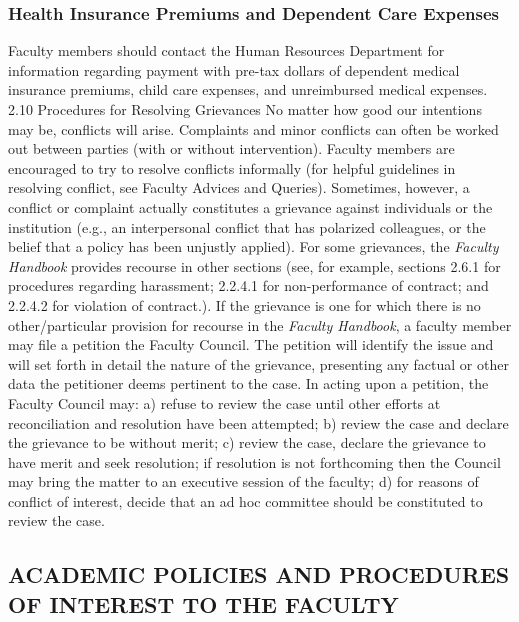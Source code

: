 \documentclass[letterpaper, 11pt]{article}
\begin{document}
		\subsubsection{Health Insurance Premiums and Dependent Care Expenses}
			Faculty members should contact the Human Resources Department for information regarding payment with pre-tax dollars of dependent medical insurance premiums, child care expenses, and unreimbursed medical expenses.
			2.10 Procedures for Resolving Grievances
			No matter how good our intentions may be, conflicts will arise.  Complaints and minor conflicts can often be worked out between parties (with or without intervention).  Faculty members are encouraged to try to resolve conflicts informally (for helpful guidelines in resolving conflict, see Faculty Advices and Queries).
			Sometimes, however, a conflict or complaint actually constitutes a grievance against individuals or the institution (e.g., an interpersonal conflict that has polarized colleagues, or the belief that a policy has been unjustly applied).  For some grievances, the \emph{Faculty Handbook} provides recourse in other sections (see, for example, sections 2.6.1 for procedures regarding harassment; 2.2.4.1 for non-performance of contract; and 2.2.4.2 for violation of contract.).
			If the grievance is one for which there is no other/particular provision for recourse in the \emph{Faculty Handbook}, a faculty member may file a petition the Faculty Council.  The petition will identify the issue and will set forth in detail the nature of the grievance, presenting any factual or other data the petitioner deems pertinent to the case.  In acting upon a petition, the Faculty Council may:
			a) refuse to review the case until other efforts at reconciliation and resolution have been attempted;
			b) review the case and declare the grievance to be without merit;
			c) review the case, declare the grievance to have merit and seek resolution; if resolution is not forthcoming then the Council may bring the matter to an executive session of the faculty;
			d) for reasons of conflict of interest, decide that an ad hoc committee should be constituted to review the case.

	\subsection{ACADEMIC POLICIES AND PROCEDURES OF INTEREST TO THE FACULTY}
\end{document}

